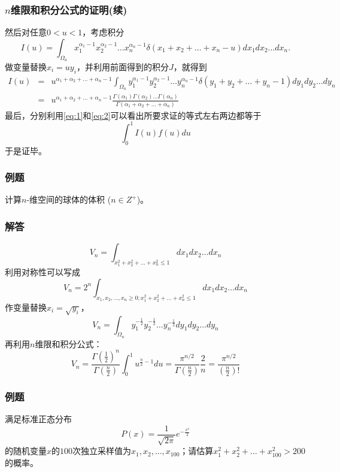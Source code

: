 \documentclass[CJK,13pt]{beamer}
\begin{document}
\begin{frame}
  \frametitle{$n$维限和积分公式的证明(续)}
  
      {\scriptsize
        然后对任意$0<u<1$，考虑积分
        \begin{equation}
        I(u)= \int_{\Omega_n} x_1^{\alpha_1-1}x_2^{\alpha_2-1}\ldots x_n^{\alpha_n-1} \delta(x_1+x_2+\ldots+x_n-u) dx_1dx_2\ldots dx_n.\label{eq:1}
        \end{equation}
        做变量替换$x_i = uy_i$，并利用前面得到的积分$J$，就得到
        \begin{eqnarray}
        I(u) &=& u^{\alpha_1+\alpha_2+\ldots+\alpha_n-1} \int_{\Omega_n} y_1^{\alpha_1-1}y_2^{\alpha_2-1}\ldots y_n^{\alpha_n-1} \delta(y_1+y_2+\ldots+y_n-1) dy_1dy_2\ldots dy_n \nonumber \\
        &=& u^{\alpha_1+\alpha_2+\ldots+\alpha_n-1} \frac{\Gamma(\alpha_1)\Gamma(\alpha_2)\ldots \Gamma(\alpha_n)}{\Gamma(\alpha_1+\alpha_2+\ldots + \alpha_n)} \label{eq:2}
        \end{eqnarray}
        最后，分别利用\eqref{eq:1}和\eqref{eq:2}可以看出所要求证的等式左右两边都等于
        $$ \int_0^1 I(u) f(u) du $$
        于是证毕。
        }
  
\end{frame}

\begin{frame}
  \frametitle{例题}
  
  计算$n$-维空间的球体的体积 ($n\in Z^+$)。
  
\end{frame}

\begin{frame}
  \frametitle{解答}
  
  {\small
  $$ V_n = \int_{x_1^2+x_2^2+\ldots +x_n^2\le 1} dx_1 dx_2 \ldots dx_n  $$
  利用对称性可以写成
  $$ V_n = 2^n\int_{x_1,x_2,\ldots,x_n\ge 0; x_1^2+x_2^2+\ldots +x_n^2\le 1} dx_1 dx_2 \ldots dx_n  $$
  作变量替换$x_i = \sqrt{y_i}$，
  $$  V_n = \int_{\Omega_n} y_1^{-\frac{1}{2}}y_2^{-\frac{1}{2}}\ldots y_n^{-\frac{1}{2}}dy_1 dy_2 \ldots dy_n  $$
  再利用$n$维限和积分公式：
$$V_n = \frac{\Gamma\left(\frac{1}{2}\right)^n}{\Gamma\left(\frac{n}{2}\right)}\int_0^1 u^{\frac{n}{2}-1} du = \frac{\pi^{n/2}}{\Gamma\left(\frac{n}{2}\right)}\frac{2}{n} = \frac{\pi^{n/2}}{\left(\frac{n}{2}\right)!} $$}
  
\end{frame}

\begin{frame}
  \frametitle{例题}
  
  满足标准正态分布$$P(x) = \frac{1}{\sqrt{2\pi}}e^{-\frac{x^2}{2}}$$的随机变量$x$的$100$次独立采样值为$x_1,x_2,\ldots, x_{100}$；请估算$x_1^2+x_2^2+\ldots +x_{100}^2 > 200 $ 的概率。
  
\end{frame}
\end{document}
